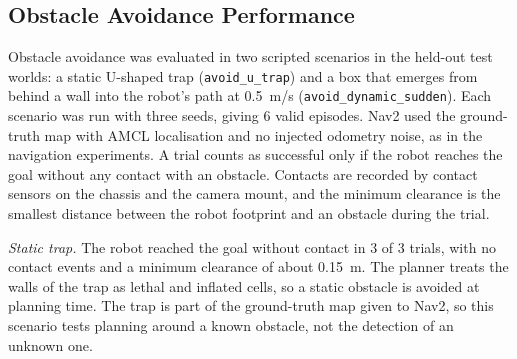 \subsection{Obstacle Avoidance Performance}
\label{subsec:avoidance}

Obstacle avoidance was evaluated in two scripted scenarios in the held-out test worlds: a static U-shaped trap (\texttt{avoid\_u\_trap}) and a box that emerges from behind a wall into the robot's path at 0.5~m/s (\texttt{avoid\_dynamic\_sudden}). Each scenario was run with three seeds, giving 6 valid episodes. Nav2 used the ground-truth map with AMCL localisation and no injected odometry noise, as in the navigation experiments. A trial counts as successful only if the robot reaches the goal without any contact with an obstacle. Contacts are recorded by contact sensors on the chassis and the camera mount, and the minimum clearance is the smallest distance between the robot footprint and an obstacle during the trial.

\begin{table}[htbp]
\centering
\caption{Obstacle avoidance results. Each scenario has three episodes, so the intervals are wide. The Wilson interval is the 95\% interval for the trial success rate. Clearance is the mean of the per-episode minima; in the dynamic scenario these are 0.00, 0.21 and 0.29~m.}
\label{tab:avoidance}
\small
{}
\end{table}

\noindent\textit{Static trap.} The robot reached the goal without contact in 3 of 3 trials, with no contact events and a minimum clearance of about 0.15~m. The planner treats the walls of the trap as lethal and inflated cells, so a static obstacle is avoided at planning time. The trap is part of the ground-truth map given to Nav2, so this scenario tests planning around a known obstacle, not the detection of an unknown one.

